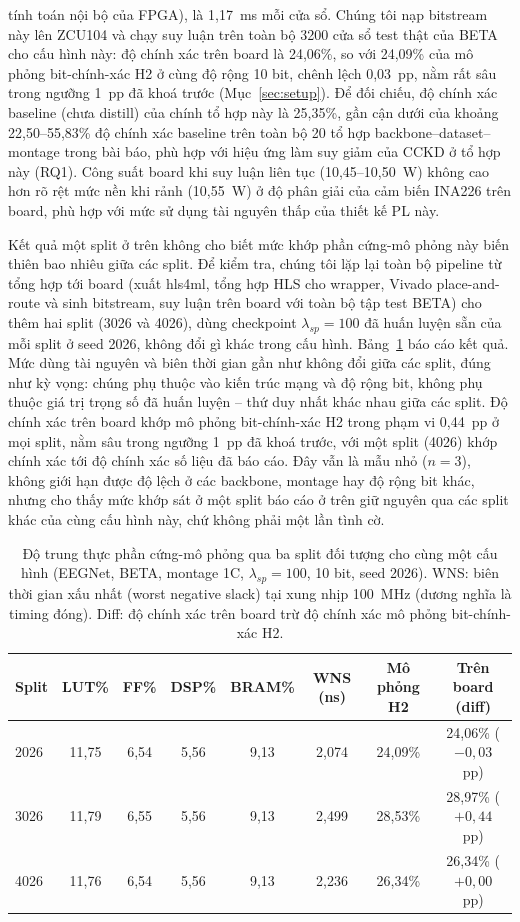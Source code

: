 \documentclass[11pt,a4paper,twoside,asymmetric]{article}
\begin{document}
tính toán nội bộ của FPGA), là 1,17~ms mỗi cửa sổ. Chúng tôi nạp bitstream này lên ZCU104 và chạy suy
luận trên toàn bộ 3200 cửa sổ test thật của BETA cho cấu hình này: độ chính xác trên board là
24,06\%, so với 24,09\% của mô phỏng bit-chính-xác H2 ở cùng độ rộng 10 bit, chênh lệch 0,03~pp, nằm
rất sâu trong ngưỡng 1~pp đã khoá trước (Mục~\ref{sec:setup}). Để đối chiếu, độ chính xác baseline
(chưa distill) của chính tổ hợp này là 25,35\%, gần cận dưới của khoảng 22,50--55,83\% độ chính xác
baseline trên toàn bộ 20 tổ hợp backbone--dataset--montage trong bài báo, phù hợp với hiệu ứng làm
suy giảm của CCKD ở tổ hợp này (RQ1). Công suất board khi suy luận liên tục (10,45--10,50~W) không
cao hơn rõ rệt mức nền khi rảnh (10,55~W) ở độ phân giải của cảm biến INA226 trên board, phù hợp với
mức sử dụng tài nguyên thấp của thiết kế PL này.

Kết quả một split ở trên không cho biết mức khớp phần cứng-mô phỏng này biến thiên bao nhiêu giữa các split. Để kiểm tra, chúng tôi lặp lại toàn bộ pipeline từ tổng hợp tới board (xuất hls4ml, tổng hợp HLS cho wrapper, Vivado place-and-route và sinh bitstream, suy luận trên board với toàn bộ tập test BETA) cho thêm hai split (3026 và 4026), dùng checkpoint $\lambda_{sp}=100$ đã huấn luyện sẵn của mỗi split ở seed 2026, không đổi gì khác trong cấu hình. Bảng~\ref{tab:plvariability} báo cáo kết quả. Mức dùng tài nguyên và biên thời gian gần như không đổi giữa các split, đúng như kỳ vọng: chúng phụ thuộc vào kiến trúc mạng và độ rộng bit, không phụ thuộc giá trị trọng số đã huấn luyện -- thứ duy nhất khác nhau giữa các split. Độ chính xác trên board khớp mô phỏng bit-chính-xác H2 trong phạm vi 0,44~pp ở mọi split, nằm sâu trong ngưỡng 1~pp đã khoá trước, với một split (4026) khớp chính xác tới độ chính xác số liệu đã báo cáo. Đây vẫn là mẫu nhỏ ($n=3$), không giới hạn được độ lệch ở các backbone, montage hay độ rộng bit khác, nhưng cho thấy mức khớp sát ở một split báo cáo ở trên giữ nguyên qua các split khác của cùng cấu hình này, chứ không phải một lần tình cờ.

\begin{table}[htbp]
\caption{Độ trung thực phần cứng-mô phỏng qua ba split đối tượng cho cùng một cấu hình (EEGNet, BETA, montage 1C, $\lambda_{sp}=100$, 10 bit, seed 2026). WNS: biên thời gian xấu nhất (worst negative slack) tại xung nhịp 100~MHz (dương nghĩa là timing đóng). Diff: độ chính xác trên board trừ độ chính xác mô phỏng bit-chính-xác H2.}
\label{tab:plvariability}
\begin{center}
\footnotesize
\begin{tabular}{lccccccc}
\toprule
Split & LUT\% & FF\% & DSP\% & BRAM\% & WNS (ns) & Mô phỏng H2 & Trên board (diff) \\
\midrule
2026 & 11,75 & 6,54 & 5,56 & 9,13 & 2,074 & 24,09\% & 24,06\% ($-0,03$ pp) \\
3026 & 11,79 & 6,55 & 5,56 & 9,13 & 2,499 & 28,53\% & 28,97\% ($+0,44$ pp) \\
4026 & 11,76 & 6,54 & 5,56 & 9,13 & 2,236 & 26,34\% & 26,34\% ($+0,00$ pp) \\
\bottomrule
\end{tabular}
\end{center}
\end{table}
\end{document}
